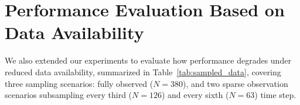 \documentclass[openacc]{rsproca_new}%
\begin{document}


\section{Performance Evaluation Based on Data Availability}
We also extended our experiments to evaluate how performance degrades under reduced data availability, summarized in Table~\ref{tab:sampled_data}, covering three sampling scenarios: fully observed ($N=380$), and two sparse observation scenarios subsampling every third ($N=126$) and every sixth ($N=63$) time step.
\end{document}
